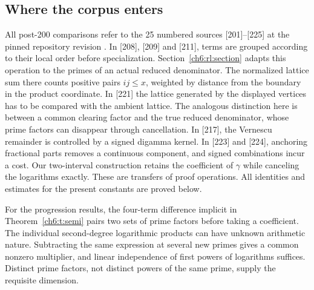 \documentclass[11pt,a4paper,oneside,openany]{report}
\theoremstyle{remark}\newtheorem{remark}[theorem]{Remark}
\numberwithin{equation}{section}
\begin{document}
\subsection*{Where the corpus enters}
All post-200 comparisons refer to the 25 numbered sources [201]--[225] at the pinned repository revision \cite{corpus}. In [208], [209] and [211], terms are grouped according to their local order before specialization. Section~\ref{ch6:rl:section} adapts this operation to the primes of an actual reduced denominator. The normalized lattice sum there counts positive pairs $ij\le x$, weighted by distance from the boundary in the product coordinate. In [221] the lattice generated by the displayed vertices has to be compared with the ambient lattice. The analogous distinction here is between a common clearing factor and the true reduced denominator, whose prime factors can disappear through cancellation. In [217], the Vernescu remainder is controlled by a signed digamma kernel. In [223] and [224], anchoring fractional parts removes a continuous component, and signed combinations incur a cost. Our two-interval construction retains the coefficient of $\gamma$ while canceling the logarithms exactly. These are transfers of proof operations. All identities and estimates for the present constants are proved below.

For the progression results, the four-term difference implicit in Theorem~\ref{ch6:t:semi} pairs two sets of prime factors before taking a coefficient. The individual second-degree logarithmic products can have unknown arithmetic nature. Subtracting the same expression at several new primes gives a common nonzero multiplier, and linear independence of first powers of logarithms suffices. Distinct prime factors, not distinct powers of the same prime, supply the requisite dimension.
\end{document}
